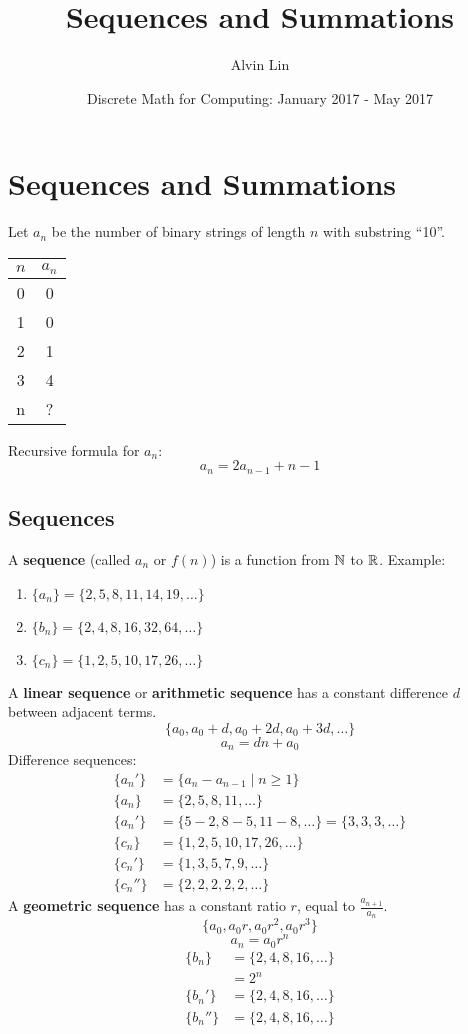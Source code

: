 \documentclass{math}
\title{Sequences and Summations}
\author{Alvin Lin}
\date{Discrete Math for Computing: January 2017 - May 2017}
\begin{document}
\maketitle

\section*{Sequences and Summations}
Let \( a_{n} \) be the number of binary strings of length \( n \) with substring
``10''.
\begin{center}
  \begin{tabular}{|c|c|}
    \hline
    \( n \) & \( a_{n} \) \\
    \hline
    0 & 0 \\
    \hline
    1 & 0 \\
    \hline
    2 & 1 \\
    \hline
    3 & 4 \\
    \hline
    n & ? \\
    \hline
  \end{tabular}
\end{center}
Recursive formula for \( a_{n} \):
\[ a_{n} = 2a_{n-1}+n-1 \]

\subsection*{Sequences}
A \textbf{sequence} (called \( a_{n} \) or \( f(n) \)) is a function from
\( \mathbb{N} \) to \( \mathbb{R} \). Example:
\begin{enumerate}
  \item \( \{a_{n}\} = \{2,5,8,11,14,19,\dots\} \)
  \item \( \{b_{n}\} = \{2,4,8,16,32,64,\dots\} \)
  \item \( \{c_{n}\} = \{1,2,5,10,17,26,\dots\} \)
\end{enumerate}
A \textbf{linear sequence} or \textbf{arithmetic sequence} has a constant
difference \( d \) between adjacent terms.
\[ \{a_{0},a_{0}+d,a_{0}+2d,a_{0}+3d,\dots\} \]
\[ a_{n} = dn+a_{0} \]
Difference sequences:
\begin{align*}
  \{a_{n}'\} &= \{a_{n}-a_{n-1}\mid n \geq 1\} \\
  \{a_{n}\} &= \{2,5,8,11,\dots\} \\
  \{a_{n}'\} &= \{5-2,8-5,11-8,\dots\} = \{3,3,3,\dots\} \\
  \{c_{n}\} &= \{1,2,5,10,17,26,\dots\} \\
  \{c_{n}'\} &= \{1,3,5,7,9,\dots\} \\
  \{c_{n}''\} &= \{2,2,2,2,2,\dots\}
\end{align*}
A \textbf{geometric sequence} has a constant ratio \( r \), equal to
\( \frac{a_{n+1}}{a_{n}} \).
\[ \{a_{0},a_{0}r,a_{0}r^{2},a_{0}r^{3}\} \]
\[ a_{n} = a_{0}r^{n} \]
\begin{align*}
  \{b_{n}\} &= \{2,4,8,16,\dots\} \\
  &= 2^{n} \\
  \{b_{n}'\} &= \{2,4,8,16,\dots\} \\
  \{b_{n}''\} &= \{2,4,8,16,\dots\}
\end{align*}
\end{document}
